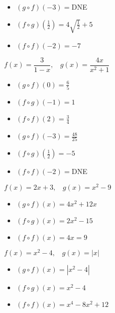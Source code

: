 \documentclass[12pt]{book}
\theoremstyle{definition}
\begin{document}
\begin{oddenumerate}
\begin{multicols}{3}
\begin{itemize}
\item  $(g\circ f)(-3)=$DNE
\item  $(f\circ g)(\frac{1}{2})=4\sqrt{\frac{1}{2}}+5$
\item  $(f\circ f)(-2)=-7$
\end{itemize}
\end{multicols}

\item $f(x)=\dfrac{3}{1-x},~~~~g(x)=\dfrac{4x}{x^2+1}$
\begin{multicols}{3}
\begin{itemize}
\item  $(g\circ f)(0)=\frac{6}{5}$
\item  $(f\circ g)(-1)=1$
\item  $(f\circ f)(2)=\frac{3}{4}$
\end{itemize}
\end{multicols}

\begin{multicols}{3}
\begin{itemize}
\item  $(g\circ f)(-3)=\frac{48}{25}$
\item  $(f\circ g)(\frac{1}{2})=-5$
\item  $(f\circ f)(-2)=$DNE
\end{itemize}
\end{multicols}
\newpage
\item $f(x)=2x+3,~~~~g(x)=x^2-9$
\begin{multicols}{3}
\begin{itemize}
\item  $(g\circ f)(x)=4x^2+12x$
\item  $(f\circ g)(x)=2x^2-15$
\item  $(f\circ f)(x)=4x=9$
\end{itemize}
\end{multicols}

\item $f(x)=x^2-4,~~~~g(x)=|x|$
\begin{multicols}{3}
\begin{itemize}
\item  $(g\circ f)(x)=|x^2-4|$
\item  $(f\circ g)(x)=x^2-4$
\item  \mbox{$(f\circ f)(x)=x^4-8x^2+12$}
\end{itemize}
\end{multicols}


\end{oddenumerate}
\end{document}
